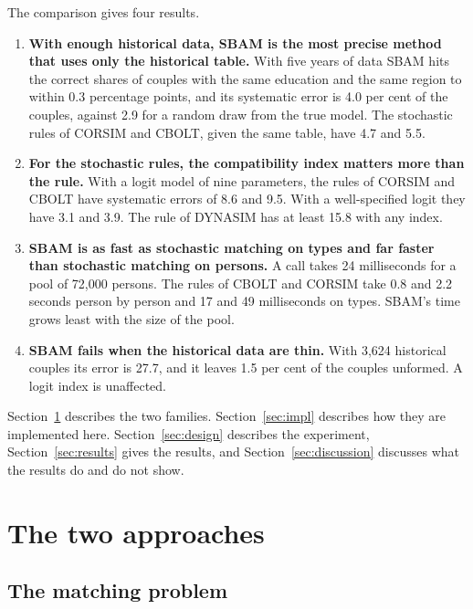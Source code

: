 \documentclass[12pt,a4paper]{article}
\begin{document}
The comparison gives four results.

\begin{enumerate}
\item \textbf{With enough historical data, SBAM is the most precise method that uses only the
historical table.} With five years of data SBAM hits the correct shares of couples with the same
education and the same region to within 0.3 percentage points, and its systematic error is 4.0
per cent of the couples, against 2.9 for a random draw from the true model. The stochastic rules
of CORSIM and CBOLT, given the same table, have 4.7 and 5.5.

\item \textbf{For the stochastic rules, the compatibility index matters more than the rule.}
With a logit model of nine parameters, the rules of CORSIM and CBOLT have systematic errors of
8.6 and 9.5. With a well-specified logit they have 3.1 and 3.9. The rule of DYNASIM has at least
15.8 with any index.

\item \textbf{SBAM is as fast as stochastic matching on types and far faster than stochastic
matching on persons.} A call takes 24 milliseconds for a pool of 72,000 persons. The rules of
CBOLT and CORSIM take 0.8 and 2.2 seconds person by person and 17 and 49 milliseconds on types.
SBAM's time grows least with the size of the pool.

\item \textbf{SBAM fails when the historical data are thin.} With 3,624 historical couples its
error is 27.7, and it leaves 1.5 per cent of the couples unformed. A logit index is unaffected.
\end{enumerate}

Section~\ref{sec:methods} describes the two families. Section~\ref{sec:impl} describes how they
are implemented here. Section~\ref{sec:design} describes the experiment, Section~\ref{sec:results}
gives the results, and Section~\ref{sec:discussion} discusses what the results do and do not show.

\section{The two approaches}\label{sec:methods}

\subsection{The matching problem}
\end{document}
